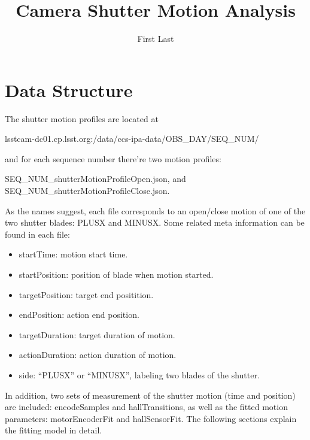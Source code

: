 \documentclass[OPS,lsstdraft,authoryear,toc]{lsstdoc}
\title{Camera Shutter Motion Analysis}
\author{%
First Last
}
\date{\vcsDate}
\begin{document}
\maketitle

\section{Data Structure}
The shutter motion profiles are located at 
\begin{displayquote}
lsstcam-dc01.cp.lsst.org:/data/ccs-ipa-data/OBS\_DAY/SEQ\_NUM/
\end{displayquote}
and for each sequence number there're two motion profiles:
\begin{displayquote}
SEQ\_NUM\_shutterMotionProfileOpen.json, and  \\ SEQ\_NUM\_shutterMotionProfileClose.json. 
\end{displayquote}
As the names suggest, each file corresponds to an open/close motion of one of the two shutter blades: PLUSX and MINUSX.
Some related meta information can be found in each file:
\begin{itemize}
    \item[] startTime: motion start time.
    \item[] startPosition: position of blade when motion started.
    \item[] targetPosition: target end positition.
    \item[] endPosition: action end position.
    \item[] targetDuration: target duration of motion.
    \item[] actionDuration: action duration of motion.
    \item[] side: ``PLUSX'' or ``MINUSX'', labeling two blades of the shutter.
\end{itemize}
In addition, two sets of measurement of the shutter motion (time and position) are included: encodeSamples and hallTransitions, as well as the fitted motion parameters: motorEncoderFit and hallSensorFit.  The following sections explain the fitting model in detail.
\end{document}

